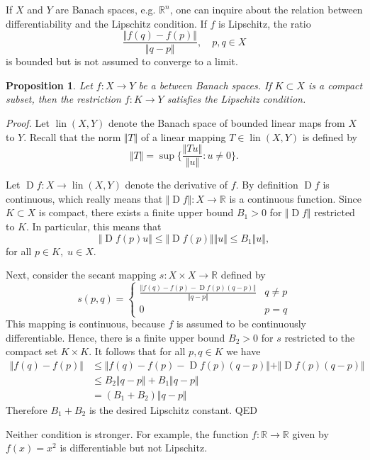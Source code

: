 \documentclass{article}
\newcommand{\reals}{\mathbb{R}}
\newtheorem{proposition}{Proposition}
\newcommand{\lin}{\operatorname{lin}}
\newcommand{\Df}{{\operatorname{D}f}}
\begin{document}
If $X$ and $Y$ are Banach spaces, e.g. $\reals^n$, one can inquire about the relation
between differentiability and the Lipschitz condition.    If $f$ is Lipschitz, the ratio
$$\frac{ \Vert f(q)-f(p)\Vert}{\Vert q-p \Vert},\quad p,q\in X$$
is bounded but is not assumed to converge to a limit.

\begin{proposition}
  Let $f:X\to Y$ be a  between
  Banach spaces.  If $K\subset X$ is a compact
  subset, then the restriction $f:K\to Y$ satisfies the Lipschitz
  condition.
\end{proposition}
\emph{Proof.}
Let $\lin(X,Y)$ denote the Banach space of bounded linear maps from
$X$ to $Y$.  Recall that the norm $\Vert T\Vert$ of a linear mapping
$T\in\lin(X,Y)$ is defined by
$$\Vert T \Vert = \sup \{ \frac{\Vert Tu \Vert}{\Vert u\Vert} : u\neq 0\}.$$

Let $\Df:X\to \lin(X,Y)$ denote the derivative of $f$.  By definition
$\Df$ is continuous, which really means that
$\Vert \Df \Vert: X\to \reals$
is a continuous function.  Since
$K\subset X$ is compact, there exists a finite upper bound $B_1>0$ for
$\Vert \Df\Vert$ restricted to $K$.  In particular, this means that
$$\Vert \Df(p) u \Vert \leq \Vert \Df(p)\Vert \Vert u\Vert \leq B_1
\Vert u\Vert,$$
for all $p\in K,\; u\in X$.

Next, consider the secant mapping $s:X\times X\to\reals$ defined by
$$s(p,q) = 
\begin{cases}
  \displaystyle \frac{\Vert f(q) - f(p) - \Df(p)(q-p)\Vert}{\Vert q-p\Vert} & q\neq
  p \\
  0 & p=q
\end{cases}
$$
This mapping is continuous, because $f$ is assumed to be continuously
differentiable.  Hence, there is a finite
upper bound $B_2>0$ for $s$ restricted to the compact set $K\times K$.  It
follows that for all $p,q\in K$ we have
\begin{align*}
  \Vert f(q) - f(p) \Vert &\leq \Vert f(q) - f(p) -
  \Df(p)(q-p)\Vert  + \Vert \Df(p)(q-p)\Vert\\
  &\leq B_2 \Vert q-p\Vert +   B_1 \Vert q-p\Vert\\
  &= (B_1+B_2)\Vert q-p\Vert
\end{align*}
Therefore $B_1+ B_2$ is the desired Lipschitz constant.  QED

Neither condition is stronger. For example, the function $f:\reals \to \reals$
given by $f(x) = x^2$ is differentiable but not Lipschitz.
\end{document}
